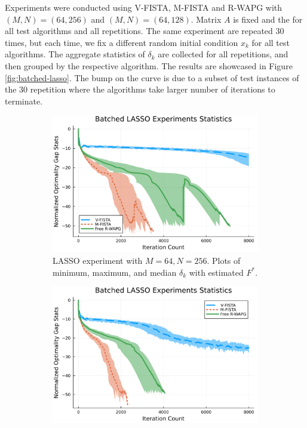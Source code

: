 \documentclass[12pt]{article}
\begin{document}
            Experiments were conducted using V-FISTA, M-FISTA and R-WAPG with $(M, N) = (64, 256)$ and $(M, N) = (64, 128)$. 
            Matrix $A$ is fixed and the for all test algorithms and all repetitions. 
            The same experiment are repeated 30 times, but each time, we fix a different random initial condition $x_k$ for all test algorithms. 
            The aggregate statistics of $\delta_k$ are collected for all repetitions, and then grouped by the respective algorithm. 
            The results are showcased in Figure \ref{fig:batched-lasso}. 
            The bump on the curve is due to a subset of test instances of the 30 repetition where the algorithms take larger number of iterations to terminate. 
            \begin{figure}[H]
                \begin{subfigure}[b]{0.47\textwidth}
                    \centering
                    \includegraphics[width=\textwidth]{assets/lasso_batched_statistics_64-256.png}
                    \caption{LASSO experiment with $M = 64, N = 256$. Plots of minimum, maximum, and median $\delta_k$ with estimated $F^*$. }
                \end{subfigure}
                \hfill
                \begin{subfigure}[b]{0.47\textwidth}
                    \centering
                    \includegraphics[width=\textwidth]{assets/lasso_batched_statistics_64-128.png}

\end{subfigure}
\end{figure}
\end{document}
